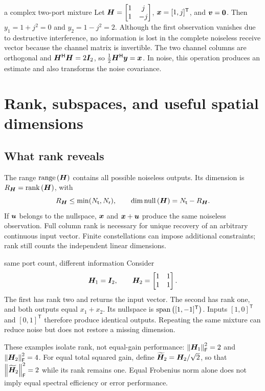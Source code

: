 \begin{example}{a complex two-port mixture}\label{ex:complex}
Let $\bm{H}=\begin{bmatrix}1&j\\1&-j\end{bmatrix}$, $\bm{x}=[1,j]^{\mathsf T}$, and $\bm{v}=\bm{0}$. Then $y_1=1+j^2=0$ and $y_2=1-j^2=2$.
Although the first observation vanishes due to destructive interference, no information is lost in the complete noiseless receive vector because the channel matrix is invertible. The two channel columns are orthogonal and ${\bm{H}}^{\mathsf{H}}\bm{H}=2\bm{I}_2$, so $\frac12{\bm{H}}^{\mathsf{H}}\bm{y}=\bm{x}$. In noise, this operation produces an estimate and also transforms the noise covariance.
\end{example}

\section{Rank, subspaces, and useful spatial dimensions}
\subsection{What rank reveals}
The range $\operatorname{range}\left(\bm{H}\right)$ contains all possible noiseless outputs. Its dimension is $R_{\bm{H}}=\operatorname{rank}\left(\bm{H}\right)$, with
\begin{equation}\label{eq:rank}
R_{\bm{H}}\leq\min(N_{\mathsf{t}},N_{\mathsf{r}}),\qquad \dim\operatorname{null}\left(\bm{H}\right)=N_{\mathsf{t}}-R_{\bm{H}}.
\end{equation}
If $\bm{u}$ belongs to the nullspace, $\bm{x}$ and $\bm{x}+\bm{u}$ produce the same noiseless observation. Full column rank is necessary for unique recovery of an arbitrary continuous input vector. Finite constellations can impose additional constraints; rank still counts the independent linear dimensions.

\begin{example}{same port count, different information}
Consider
\begin{equation}\label{eq:channels}
\bm{H}_1=\bm{I}_2,\qquad
\bm{H}_2=\begin{bmatrix}1&1\\1&1\end{bmatrix}.
\end{equation}
The first has rank two and returns the input vector. The second has rank one, and both outputs equal $x_1+x_2$. Its nullspace is $\operatorname{span}\left([1,-1]^{\mathsf T}\right)$. Inputs $[1,0]^{\mathsf T}$ and $[0,1]^{\mathsf T}$ therefore produce identical outputs. Repeating the same mixture can reduce noise but does not restore a missing dimension.

These examples isolate rank, not equal-gain performance: $\left\|\bm{H}_1\right\|_{\mathsf{F}}^2=2$ and $\left\|\bm{H}_2\right\|_{\mathsf{F}}^2=4$. For equal total squared gain, define $\widetilde{\bm{H}}_2=\bm{H}_2/\sqrt2$, so that $\left\|\widetilde{\bm{H}}_2\right\|_{\mathsf{F}}^2=2$ while its rank remains one. Equal Frobenius norm alone does not imply equal spectral efficiency or error performance.
\end{example}

